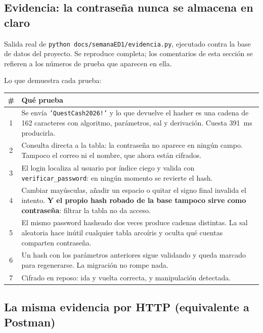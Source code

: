 \documentclass[11pt,letterpaper]{article}
\begin{document}
\subsection{Evidencia: la contraseña nunca se almacena en claro}

Salida real de \texttt{python docs/semanaED1/evidencia.py}, ejecutado contra la
base de datos del proyecto. Se reproduce completa; los comentarios de esta
sección se refieren a los números de prueba que aparecen en ella.



\vspace{0.5em}
Lo que demuestra cada prueba:

\begin{center}
\small
\begin{tabular}{@{}c >{\raggedright\arraybackslash}p{12.6cm}@{}}
\toprule
\textbf{\#} & \textbf{Qué prueba} \\
\midrule
1 & Se envía \texttt{'QuestCash2026!'} y lo que devuelve el hasher es una cadena de 162 caracteres con algoritmo, parámetros, sal y derivación. Cuesta 391~ms producirla. \\
2 & Consulta directa a la tabla: la contraseña no aparece en ningún campo. Tampoco el correo ni el nombre, que ahora están cifrados. \\
3 & El login localiza al usuario por índice ciego y valida con \texttt{verificar\_password}: en ningún momento se revierte el hash. \\
4 & Cambiar mayúsculas, añadir un espacio o quitar el signo final invalida el intento. \textbf{Y el propio hash robado de la base tampoco sirve como contraseña}: filtrar la tabla no da acceso. \\
5 & El mismo password hasheado dos veces produce cadenas distintas. La sal aleatoria hace inútil cualquier tabla arcoíris y oculta qué cuentas comparten contraseña. \\
6 & Un hash con los parámetros anteriores sigue validando y queda marcado para regenerarse. La migración no rompe nada. \\
7 & Cifrado en reposo: ida y vuelta correcta, y manipulación detectada. \\
\bottomrule
\end{tabular}
\end{center}

\subsection{La misma evidencia por HTTP (equivalente a Postman)}
\end{document}
